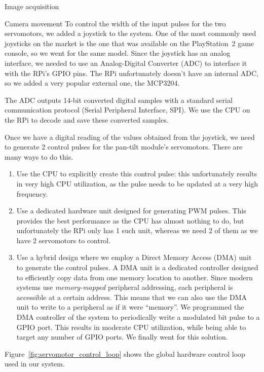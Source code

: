 \documentclass[10pt]{article}
\begin{document}
\begin{section}{Image acquisition}
\begin{subsubsection}{Camera movement}
        To control the width of the input pulses for the two servomotors, we added a joystick to the system. One of the most commonly used joysticks on the market is the one that was available on the PlayStation~2 game console, so we went for the same model. Since the joystick has an {analog} interface, we needed to use an Analog-Digital Converter (ADC) to interface it with the RPi's GPIO pins. The RPi unfortunately doesn't have an internal ADC, so we added a very popular external one, the MCP3204.

        \medskip

        The ADC outputs 14-bit converted digital samples with a standard serial communication protocol (Serial Peripheral Interface, SPI). We use the CPU on the RPi to decode and save these converted samples.

        \medskip

        Once we have a digital reading of the values obtained from the joystick, we need to generate 2 control pulses for the pan-tilt module's servomotors. There are many ways to do this.

        \begin{enumerate}
            \item Use the CPU to explicitly create this control pulse: this unfortunately results in very high CPU utilization, as the pulse needs to be updated at a very high frequency.
            \item Use a dedicated hardware unit designed for generating PWM pulses. This provides the best performance as the CPU has almost nothing to do, but unfortunately the RPi only has 1 such unit, whereas we need 2 of them as we have 2 servomotors to control.
            \item Use a hybrid design where we employ a Direct Memory Access (DMA) unit to generate the control pulses. A DMA unit is a dedicated controller designed to efficiently copy data from one memory location to another. Since modern systems use \emph{memory-mapped} peripheral addressing, each peripheral is accessible at a certain address. This means that we can also use the DMA unit to write to a peripheral as if it were ``memory''. We programmed the DMA controller of the system to periodically write a modulated bit pulse to a GPIO port. This results in moderate CPU utilization, while being able to target any number of GPIO ports. We finally went for this solution.
        \end{enumerate}

        Figure~\ref{fig:servomotor_control_loop} shows the global hardware control loop used in our system.


\end{subsubsection}
\end{section}
\end{document}
